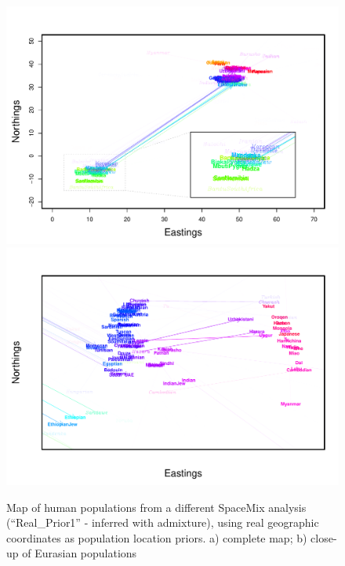 \documentclass[12pt]{article}
\begin{document}
\clearpage

\begin{figure}
	\centering
			{\includegraphics[width=\textwidth,height=0.71\textwidth]{figs/globetrotter/globe_Ad_map_AfricaInset_realpr2.pdf}}
			{\includegraphics[width=\textwidth,height=0.71\textwidth]{figs/globetrotter/eurasia_Ad_map_indproc_realpr2.pdf}}
	\caption{Map of human populations from a different SpaceMix analysis (``Real\_Prior1'' - inferred with admixture), using real geographic coordinates as population location priors. a) complete map; b) close-up of Eurasian populations}
	\label{sfig:globe_ad_maps_realpr2}
\end{figure}
\end{document}
